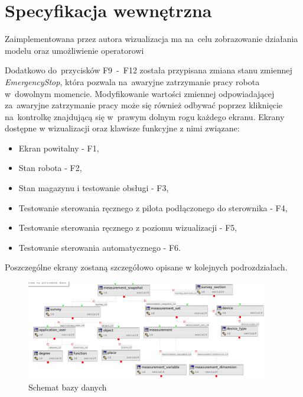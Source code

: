 \section{Specyfikacja wewnętrzna}
Zaimplementowana przez autora wizualizacja ma na~celu zobrazowanie działania modelu oraz umożliwienie operatorowi 

Dodatkowo do~przycisków F9~-~F12 została przypisana zmiana stanu zmiennej \emph{EmergencyStop}, która pozwala na~awaryjne zatrzymanie pracy robota w~dowolnym momencie. Modyfikowanie wartości zmiennej odpowiadającej za~awaryjne zatrzymanie pracy może się również odbywać poprzez kliknięcie na~kontrolkę znajdującą się w~prawym dolnym rogu każdego ekranu.
Ekrany dostępne w wizualizacji oraz klawisze funkcyjne z nimi związane:
\begin{itemize} 
\item Ekran powitalny - F1,
\item Stan robota - F2,
\item Stan magazynu i testowanie obsługi - F3,
\item Testowanie sterowania ręcznego z pilota podłączonego do sterownika - F4,
\item Testowanie sterowania ręcznego z poziomu wizualizacji - F5,
\item Testowanie sterowania automatycznego - F6.
\end{itemize}
\indent
\indent Poszczególne ekrany zostaną szczegółowo opisane w kolejnych podrozdziałach.

\begin{figure}[!htb] 	
\centering 	
\includegraphics[width=0.95\textwidth]{images/database} 
\caption{Schemat bazy danych} 
\label{template}
 \end{figure}